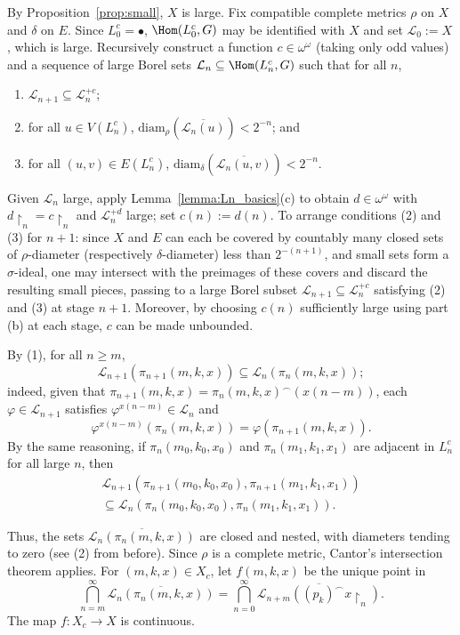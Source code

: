 By Proposition~\ref{prop:small}, $X$ is large.
Fix compatible complete metrics $\rho$ on $X$ and $\delta$ on $E$.
Since $L^c_0=\bullet$, $\Hom(L^c_0,G)$ may be identified with $X$ and set $\mathcal L_0:=X$, which is large.
Recursively construct a function $c\in\omega^\omega$ (taking only odd values) and a sequence of large Borel sets $\mathcal L_n\subseteq\Hom(L^c_n, G)$ such that for all $n$,

\begin{enumerate}[label=(\arabic*)]
    \item $\mathcal L_{n+1}\subseteq\mathcal L_n^{+c}$;
    \item for all $u\in V(L^c_n)$, $\mathrm{diam}_\rho(\overline{\mathcal L_n(u)})< 2^{-n}$; and
    \item for all $(u,v)\in E(L^c_n)$, $\mathrm{diam}_\delta(\overline{\mathcal L_n(u,v)})< 2^{-n}$.
\end{enumerate}

Given $\mathcal L_n$ large, apply Lemma~\ref{lemma:Ln_basics}(c) to obtain $d\in\omega^\omega$ with $d\restriction_n=c\restriction_n$ and $\mathcal L_n^{+d}$ large; set $c(n):=d(n)$.
To arrange conditions (2) and (3) for $n+1$: since $X$ and $E$ can each be covered by countably many closed sets of $\rho$-diameter (respectively $\delta$-diameter) less than $2^{-(n+1)}$, and small sets form a $\sigma$-ideal, one may intersect with the preimages of these covers and discard the resulting small pieces, passing to a large Borel subset $\mathcal L_{n+1}\subseteq\mathcal L_n^{+c}$ satisfying (2) and (3) at stage $n+1$.
Moreover, by choosing $c(n)$ sufficiently large using part (b) at each stage, $c$ can be made unbounded.

By (1), for all $n\geq m$, $$\mathcal L_{n+1}(\pi_{n+1}(m,k,x))\subseteq\mathcal L_n(\pi_n(m,k,x));$$ indeed, given that $\pi_{n+1}(m,k,x)=\pi_n(m,k,x)^\frown(x(n-m))$, each $\varphi\in\mathcal L_{n+1}$ satisfies $\varphi^{x(n-m)}\in\mathcal L_n$ and $$\varphi^{x(n-m)}(\pi_n(m,k,x))=\varphi(\pi_{n+1}(m,k,x)).$$
By the same reasoning, if $\pi_n(m_0,k_0,x_0)$ and $\pi_n(m_1,k_1,x_1)$ are adjacent in $L^c_n$ for all large $n$, then \begin{align*}
    \mathcal L_{n+1}(\pi_{n+1}(m_0,k_0,x_0),\pi_{n+1}(m_1,k_1,x_1))\\
    \subseteq\mathcal L_n(\pi_n(m_0,k_0,x_0),\pi_n(m_1,k_1,x_1)).
\end{align*}

Thus, the sets $\overline{\mathcal L_n(\pi_n(m,k,x))}$ are closed and nested, with diameters tending to zero (see (2) from before).
Since $\rho$ is a complete metric, Cantor's intersection theorem applies.
For $(m,k,x)\in X_c$, let $f(m,k,x)$ be the unique point in $$\bigcap_{n=m}^\infty\overline{\mathcal L_n(\pi_n(m,k,x))}=\bigcap_{n=0}^\infty\overline{\mathcal L_{n+m}((p_k)^\frown x\restriction_n)}.$$
The map $f\colon X_c\to X$ is continuous.

